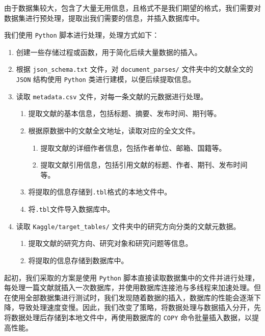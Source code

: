 \documentclass[UTF8,openany]{ctexbook}
\begin{document}
由于数据集较大，包含了大量无用信息，且格式不是我们期望的格式，我们需要对数据集进行预处理，提取出我们需要的信息，并插入数据库中。

我们使用 \texttt{Python} 脚本进行处理，处理方式如下：

\begin{enumerate}
    \item 创建一些存储过程或函数，用于简化后续大量数据的插入。
    \item 根据 \texttt{json\_schema.txt} 文件，对 \texttt{document\_parses/} 文件夹中的文献全文的 \texttt{JSON} 结构使用 \texttt{Python} 类进行建模，以便后续提取信息。
    \item 读取 \texttt{metadata.csv} 文件，对每一条文献的元数据进行处理。
    \begin{enumerate}
        \item 提取文献的基本信息，包括标题、摘要、发布时间、期刊等。
        \item 根据原数据中的文献全文地址，读取对应的全文文件。
        
        \begin{enumerate}
            \item 提取文献的详细作者信息，包括作者单位、邮箱、国籍等。
            \item 提取文献引用信息，包括引用文献的标题、作者、期刊、发布时间等。
        \end{enumerate}

        \item 将提取的信息存储到\texttt{.tbl}格式的本地文件中。
        \item 将\texttt{.tbl}文件导入数据库中。
    \end{enumerate}
    \item 读取 \texttt{Kaggle/target\_tables/} 文件夹中的研究方向分类的文献元数据。
    
    \begin{enumerate}
        \item 提取文献的研究方向、研究对象和研究问题等信息。
        \item 将提取的信息存储到数据库中。
    \end{enumerate}
\end{enumerate}

起初，我们采取的方案是使用 \texttt{Python} 脚本直接读取数据集中的文件并进行处理，每处理一篇文献就插入一次数据库，并使用数据库连接池与多线程来加速处理。但在使用全部数据集进行测试时，我们发现随着数据的插入，数据库的性能会逐渐下降，导致处理速度变慢。因此，我们改变了策略，将数据处理与数据插入分开，先将数据处理后存储到本地文件中，再使用数据库的 \texttt{COPY} 命令批量插入数据，以提高性能。
\end{document}
